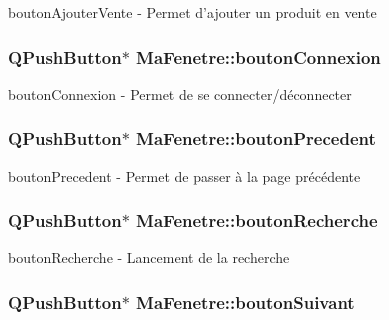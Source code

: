 bouton\-Ajouter\-Vente -\/ Permet d'ajouter un produit en vente 

\hypertarget{class_ma_fenetre_a6654bb6885a843d1a6ad9399eb7d0c36}{
\subsubsection[{bouton\-Connexion}]{\setlength{\rightskip}{0pt plus 5cm}Q\-Push\-Button$\ast$ Ma\-Fenetre\-::bouton\-Connexion\hspace{0.3cm}{\ttfamily [protected]}}}\label{class_ma_fenetre_a6654bb6885a843d1a6ad9399eb7d0c36}


bouton\-Connexion -\/ Permet de se connecter/déconnecter 

\hypertarget{class_ma_fenetre_a53b01801ba121b8240df4f1f8c9330b3}{
\subsubsection[{bouton\-Precedent}]{\setlength{\rightskip}{0pt plus 5cm}Q\-Push\-Button$\ast$ Ma\-Fenetre\-::bouton\-Precedent\hspace{0.3cm}{\ttfamily [protected]}}}\label{class_ma_fenetre_a53b01801ba121b8240df4f1f8c9330b3}


bouton\-Precedent -\/ Permet de passer à la page précédente 

\hypertarget{class_ma_fenetre_afe6e47d40e487fccd18d4bcc3c57e64e}{
\subsubsection[{bouton\-Recherche}]{\setlength{\rightskip}{0pt plus 5cm}Q\-Push\-Button$\ast$ Ma\-Fenetre\-::bouton\-Recherche\hspace{0.3cm}{\ttfamily [protected]}}}\label{class_ma_fenetre_afe6e47d40e487fccd18d4bcc3c57e64e}


bouton\-Recherche -\/ Lancement de la recherche 

\hypertarget{class_ma_fenetre_a54110f455a71febc15224b68470dd80e}{
\subsubsection[{bouton\-Suivant}]{\setlength{\rightskip}{0pt plus 5cm}Q\-Push\-Button$\ast$ Ma\-Fenetre\-::bouton\-Suivant\hspace{0.3cm}{\ttfamily [protected]}}}\label{class_ma_fenetre_a54110f455a71febc15224b68470dd80e}


